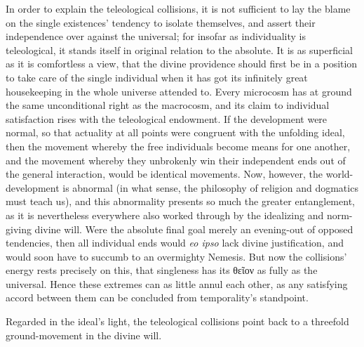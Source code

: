 \documentclass[12pt]{book}
\begin{document}
In order to explain the teleological collisions, it is not sufficient to lay
the blame on the single existences' tendency to isolate themselves, and
assert their independence over against the universal; for insofar as
individuality is teleological, it stands itself in original relation to the
absolute. It is as superficial as it is comfortless a view, that the divine
providence should first be in a position to take care of the single
individual when it has got its infinitely great housekeeping in the whole
universe attended to. Every microcosm has at ground the same unconditional
right as the macrocosm, and its claim to individual satisfaction rises with
the teleological endowment. If the development were normal, so that
actuality at all points were congruent with the unfolding ideal, then the
movement whereby the free individuals become means for one another, and the
movement whereby they unbrokenly win their independent ends out of the
general interaction, would be identical movements. Now, however, the
world-development is abnormal (in what sense, the philosophy of religion and
dogmatics must teach us), and this abnormality presents so much the greater
entanglement, as it is nevertheless everywhere also worked through by the
idealizing and norm-giving divine will. Were the absolute final goal merely
an evening-out of opposed tendencies, then all individual ends would
\textit{eo ipso} lack divine justification, and would soon have to succumb
to an overmighty Nemesis. But now the collisions' energy rests precisely on
this, that singleness has its θεῖον as fully as the universal. Hence these
extremes can as little annul each other, as any satisfying accord between
them can be concluded from temporality's standpoint.

Regarded in the ideal's light, the teleological collisions point back to a
threefold ground-movement in the divine will.
\end{document}
